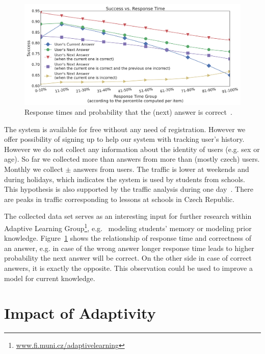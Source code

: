 \documentclass[table,color]{fithesis3/fithesis3}
\begin{document}
\begin{figure}[h]
	\begin{center}
		\includegraphics[width=\textwidth]{figure/response_time}
		\caption{Response times and probability that the (next) answer is correct~\cite{papousek2015analysis}.}
		\label{figure:response_time}
	\end{center}
\end{figure}

The system is available for free without any need of registration. However we
offer possibility of signing up to help our system with tracking user's
history. However we do not collect any information about the identity of users
(e.g. sex or age). So far we collected more than  answers
from more than  (mostly czech) users. Monthly we collect $\pm$
 answers from  users. The traffic is lower at
weekends and during holidays, which indicates the system is used by students
from schools. This hypothesis is also supported by the traffic analysis during
one day~\cite{stanislav2015factual}. There are peaks in traffic corresponding
to lessons at schools in Czech Republic.

The collected data set serves as an interesting input for further research
within Adaptive Learning Group\footnote{\url{www.fi.muni.cz/adaptivelearning}},
e.g.~\cite{pelanek2015modeling} modeling students' memory or
\cite{niznan2015student} modeling prior knowledge.
Figure~\ref{figure:response_time} shows the relationship of response time and
correctness of an answer, e.g. in case of the wrong answer longer response time
leads to higher probability the next answer will be correct. On the other side
in case of correct answers, it is exactly the opposite. This observation could be
used to improve a model for current knowledge.

\section{Impact of Adaptivity}
\end{document}
